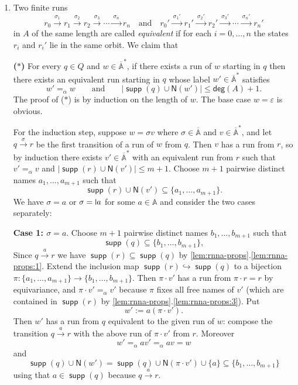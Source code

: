 \documentclass[10pt,a4paper]{amsart}
\newcommand{\midmid}{\hspace{0.2ex}{\rule[-0.1ex]{0.6pt}{1.65ex}}\hspace{0.2ex}}
\newcommand{\newletter}[1]{{\midmid}#1}
\renewcommand{\o}{\cdot}
\newcommand{\Names}[1]{\mathsf{N}(#1)}
\newcommand{\degree}{\mathsf{deg}}
\newcommand{\barA}{\overline{\names}}
\numberwithin{equation}{section}
\newcommand{\monoto}{\hookrightarrow}
\newcommand{\xto}[1]{\xrightarrow{~#1~}}
\newcommand{\seq}{\subseteq}
\renewcommand{\epsilon}{\varepsilon}
\newcommand{\+}[1]{\mathcal{#1}\xspace}
\newcommand{\names}{\mathbb{A}}
\DeclareMathOperator{\supp}{\mathsf{supp}} %
\theoremstyle{definition}
\begin{document}
\begin{enumerate} 
\item Two finite runs \[ r_0\xto{\sigma_1} r_1\xto{\sigma_2} r_2\xto{\sigma_3}\cdots \xto{\sigma_n} r_n\quad\text{and}\quad r_0'\xto{\sigma_1'} r_1'\xto{\sigma_2'} r_2'\xto{\sigma_3'}\cdots \xto{\sigma_n'} r_n'  \]
in $A$ of the same length are called \emph{equivalent} if for each $i=0,\ldots, n$ the states $r_i$ and $r_i'$ lie in the same orbit. 
We claim that


\medskip\noindent \textbf{($\ast$)} For every $q\in Q$ and $w\in \barA^*$, if there exists a run of $w$ starting in $q$ then there exists an equivalent run starting in $q$ whose label $w'\in \barA^*$ satisfies
  \[
    w'=_\alpha w\qquad\text{and}\qquad |\supp (q) \cup \Names{w'}|\leq
    \degree(A)+1.
  \]
  The proof of ($\ast$) is by induction on the length of $w$. The base case
  $w=\epsilon$ is obvious.

  \noindent For the induction step, suppose $w=\sigma v$
  where $\sigma\in \barA$ and $v\in \barA^*$, and let $q\xto{\sigma}r$ be the
   first transition of a run of $w$ from $q$. Then $v$ has a run from $r$, so by induction there exists $v'\in \barA^*$ with an equivalent run from $r$ such 
  that $v'=_\alpha v$ and $|\supp(r)\cup \Names{v'}|\leq m+1$. Choose
  $m+1$ pairwise distinct names $a_1,\ldots,a_{m+1}$ such
  that \[\supp(r)\cup \Names{v'}\seq \{a_1,\ldots, a_{m+1}\}.\] We have $\sigma=a$ or $\sigma=\newletter a$ for some $a\in \names$ and consider the two cases separately:
  
  \smallskip\noindent\textbf{Case 1: $\sigma=a$}. Choose $m+1$ pairwise
  distinct names $b_1,\ldots,b_{m+1}$ such that
  \[
    \supp(q)\seq \{b_1,\ldots,b_{m+1}\},
  \]
  Since $q\xto{a} r$ we have $\supp(r)\seq \supp(q)$ by
  \autoref{lem:rnna-props}.\ref{lem:rnna-props:1}. Extend the inclusion map
  $\supp(r)\monoto \supp(q)$ to a bijection
  $\pi\colon \{a_1,\ldots,a_{m+1}\}\to \{b_1,\ldots,b_{m+1}\}$. Then $\pi\o v'$ has a run from
  $\pi\cdot r = r$ by equivariance, and
  $\pi\cdot v'=_\alpha v'$ because $\pi$ fixes all free names of $v'$
  (which are contained in $\supp(r)$ by \autoref{lem:rnna-props}.\ref{lem:rnna-props:3}). Put
  \[
    w' := a(\pi\cdot v').
  \]
  Then $w'$ has a run from $q$ equivalent to the given run of $w$: compose the transition $q\xto{a} r$ with the above run of $\pi\o v'$ from $r$. Moreover \[w'=_\alpha av'=_\alpha av = w\] and
  \[
    \supp(q)\cup \Names{w'} = \supp(q)\cup \Names{\pi\cdot v'}\cup
    \{a\}\seq \{b_1,\ldots, b_{m+1}\}
  \]
  using that $a\in \supp(q)$ because $q\xto{a} r$.
  

\end{enumerate}
\end{document}
